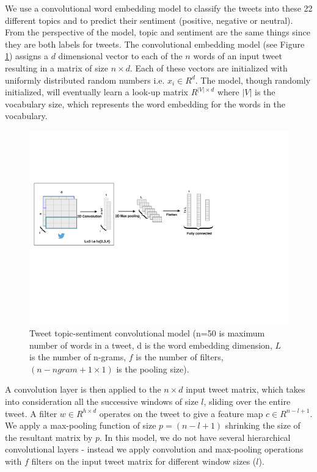 \documentclass[letterpaper]{article}
\begin{document}
We use a convolutional word embedding model to classify the tweets into these 22 different topics and to predict their sentiment (positive, negative or neutral). From the perspective of the model, topic and sentiment are the same things since they are both labels for tweets. The convolutional embedding model (see Figure \ref{topic_cnn}) assigns a $d$ dimensional
vector to each of the $n$ words of an input tweet resulting in a matrix of size $n \times d$. Each of these vectors are initialized with uniformly distributed random numbers i.e. $x_i \in {R}^d$. The model, though randomly initialized, will eventually learn a look-up matrix ${R}^{|V|\times d}$ where $|V|$ is the vocabulary size, which represents the word embedding for the words in the vocabulary.

\begin{figure}[]
\centering
\includegraphics[width=\columnwidth]{topic_classifier.pdf}
\caption{Tweet topic-sentiment convolutional model (n=50 is maximum number of words in a tweet, d is the word embedding dimension, $L$ is the number of n-grams, $f$ is the number of filters, $(n-ngram+1\times 1)$ is the pooling size).}
\label{topic_cnn}
\end{figure}

A convolution layer is then applied to the $n \times d$ input tweet matrix, which takes into consideration all the successive windows of size $l$, sliding over the entire tweet. A filter $w \in {R}^{h\times d}$ operates on the tweet to give a feature map $c\in {R}^{n-l+1}$. We apply a max-pooling function \cite{collobert2011natural} of size $p=(n-l+1)$ shrinking the size of the resultant matrix by $p$. In this model, we do not have several hierarchical convolutional layers - instead we apply convolution and max-pooling operations with $f$ filters on the input tweet matrix for different window sizes ($l$).
\end{document}
